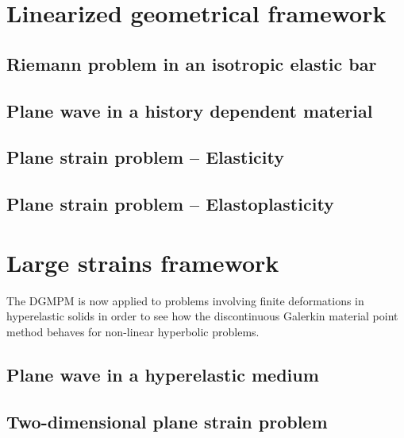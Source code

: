 \section{Linearized geometrical framework}
\label{sec:hpp_simulations}

\subsection{Riemann problem in an isotropic elastic bar}
\label{subsec:hpp_bar}


\subsection{Plane wave in a history dependent material}
\label{subsec:hpp_planewave}


\subsection{Plane strain problem -- Elasticity}
\label{subsec:el_planestrain}


\subsection{Plane strain problem -- Elastoplasticity}
\label{subsec:ep_planestrain}


\section{Large strains framework}
\label{sec:he_simulations}
The DGMPM is now applied to problems involving finite deformations in hyperelastic solids in order to see how the discontinuous Galerkin material point method behaves for non-linear hyperbolic problems.
\subsection{Plane wave in a hyperelastic medium}
\label{subsec:he_planewave}


\subsection{Two-dimensional plane strain problem}


\label{subsec:he_plate}





